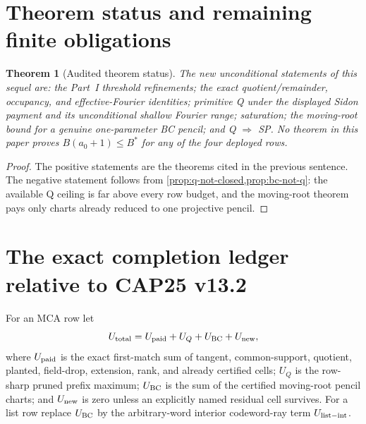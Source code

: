 \documentclass[11pt,a4paper]{amsart}
\numberwithin{equation}{section}
\newtheorem{theorem}{Theorem}[section]
\theoremstyle{remark}
\begin{document}
\section{Theorem status and remaining finite obligations}\label{sec:status-and-obligations}
\begin{theorem}[Audited theorem status]\label{thm:audited-status}
The new unconditional statements of this sequel are: the Part~I threshold refinements; the exact quotient/remainder, occupancy, and effective-Fourier identities; primitive Q under the displayed Sidon payment and its unconditional shallow Fourier range; saturation; the moving-root bound for a genuine one-parameter BC pencil; and Q $\Rightarrow$ SP.  No theorem in this paper proves $B(a_0+1)\le B^*$ for any of the four deployed rows.
\end{theorem}
\begin{proof}
The positive statements are the theorems cited in the previous sentence.  The negative statement follows from \cref{prop:q-not-closed,prop:bc-not-q}: the available Q ceiling is far above every row budget, and the moving-root theorem pays only charts already reduced to one projective pencil.
\end{proof}

\section{The exact completion ledger relative to CAP25 v13.2}\label{sec:exact-completion-ledger}
For an MCA row let
\begin{equation}
 U_{\rm total}=U_{\rm paid}+U_Q+U_{\rm BC}+U_{\rm new},\label{eq:mca-final-ledger}
\end{equation}
where $U_{\rm paid}$ is the exact first-match sum of tangent, common-support, quotient, planted, field-drop, extension, rank, and already certified cells; $U_Q$ is the row-sharp pruned prefix maximum; $U_{\rm BC}$ is the sum of the certified moving-root pencil charts; and $U_{\rm new}$ is zero unless an explicitly named residual cell survives.  For a list row replace $U_{\rm BC}$ by the arbitrary-word interior codeword-ray term $U_{\rm list-int}$.
\end{document}
